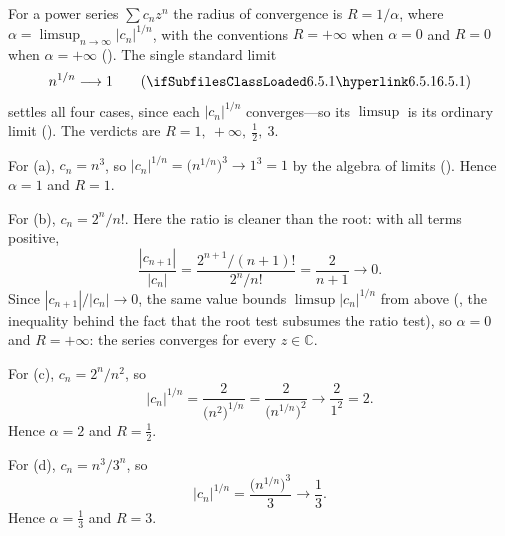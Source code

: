 \documentclass[main.tex]{subfiles}
\begin{document}
\begin{Solution}
For a power series $\sum c_n z^n$ the radius of convergence is $R=1/\alpha$, where
$\alpha=\limsup_{n\to\infty}|c_n|^{1/n}$, with the conventions $R=+\infty$ when $\alpha=0$ and $R=0$
when $\alpha=+\infty$ (). The single standard limit
\[
n^{1/n}\longrightarrow 1\qquad(\xrefL{6.5.1})
\]
settles all four cases, since each $|c_n|^{1/n}$ converges---so its $\limsup$ is its ordinary limit
(). The verdicts are $R=1,\ +\infty,\ \tfrac12,\ 3$.

For (a), $c_n=n^3$, so $|c_n|^{1/n}=\bigl(n^{1/n}\bigr)^{3}\to 1^3=1$ by the algebra of limits
(). Hence $\alpha=1$ and $R=1$.

For (b), $c_n=2^n/n!$. Here the ratio is cleaner than the root: with all terms positive,
\[
\frac{|c_{n+1}|}{|c_n|}=\frac{2^{n+1}/(n+1)!}{2^{n}/n!}=\frac{2}{n+1}\longrightarrow 0 .
\]
Since $|c_{n+1}|/|c_n|\to 0$, the same value bounds $\limsup|c_n|^{1/n}$ from above
(, the inequality behind the fact that the root test subsumes the ratio test), so
$\alpha=0$ and $R=+\infty$: the series converges for every $z\in\mathbb C$.

For (c), $c_n=2^n/n^2$, so
\[
|c_n|^{1/n}=\frac{2}{\bigl(n^{2}\bigr)^{1/n}}=\frac{2}{\bigl(n^{1/n}\bigr)^{2}}\longrightarrow\frac{2}{1^{2}}=2 .
\]
Hence $\alpha=2$ and $R=\tfrac12$.

For (d), $c_n=n^3/3^n$, so
\[
|c_n|^{1/n}=\frac{\bigl(n^{1/n}\bigr)^{3}}{3}\longrightarrow\frac{1}{3} .
\]
Hence $\alpha=\tfrac13$ and $R=3$.
\end{Solution}
\end{document}
